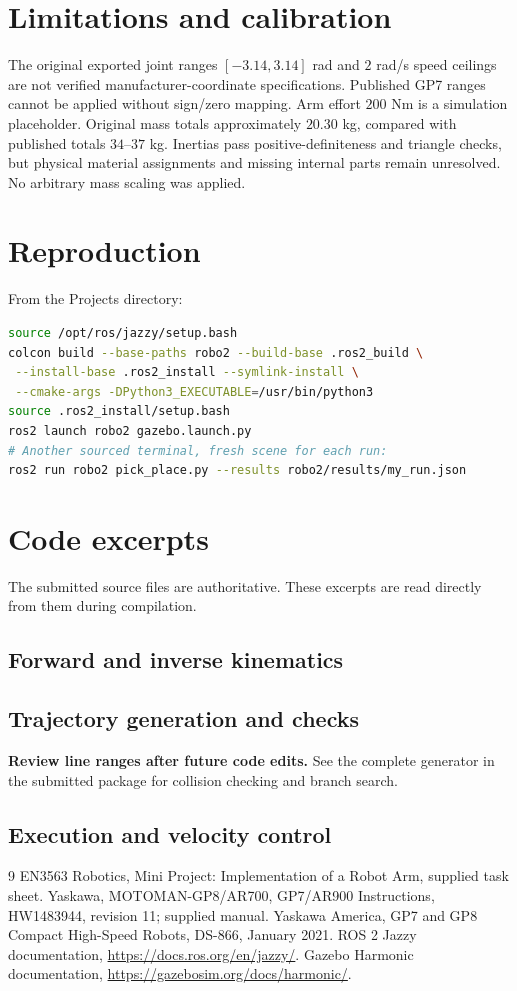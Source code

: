 \documentclass[11pt,a4paper]{article}
\begin{document}
\section{Limitations and calibration}
The original exported joint ranges $[-3.14,3.14]$ rad and $2$ rad/s speed ceilings are not verified manufacturer-coordinate specifications. Published GP7 ranges cannot be applied without sign/zero mapping. Arm effort $200$ Nm is a simulation placeholder. Original mass totals approximately $20.30$ kg, compared with published totals $34$--$37$ kg. Inertias pass positive-definiteness and triangle checks, but physical material assignments and missing internal parts remain unresolved. No arbitrary mass scaling was applied.
\section{Reproduction}
From the Projects directory:
\begin{lstlisting}[language=bash]
source /opt/ros/jazzy/setup.bash
colcon build --base-paths robo2 --build-base .ros2_build \
 --install-base .ros2_install --symlink-install \
 --cmake-args -DPython3_EXECUTABLE=/usr/bin/python3
source .ros2_install/setup.bash
ros2 launch robo2 gazebo.launch.py
# Another sourced terminal, fresh scene for each run:
ros2 run robo2 pick_place.py --results robo2/results/my_run.json
\end{lstlisting}
\appendix
\section{Code excerpts}
The submitted source files are authoritative. These excerpts are read directly from them during compilation.
\subsection{Forward and inverse kinematics}

\subsection{Trajectory generation and checks}
\textbf{Review line ranges after future code edits.} See the complete generator in the submitted package for collision checking and branch search.
\subsection{Execution and velocity control}

\begin{thebibliography}{9}
 EN3563 Robotics, Mini Project: Implementation of a Robot Arm, supplied task sheet.
\bibitem{manual} Yaskawa, MOTOMAN-GP8/AR700, GP7/AR900 Instructions, HW1483944, revision 11; supplied manual.
\bibitem{data} Yaskawa America, GP7 and GP8 Compact High-Speed Robots, DS-866, January 2021.
\bibitem{ros} ROS 2 Jazzy documentation, \url{https://docs.ros.org/en/jazzy/}.
\bibitem{gz} Gazebo Harmonic documentation, \url{https://gazebosim.org/docs/harmonic/}.
\end{thebibliography}
\end{document}

